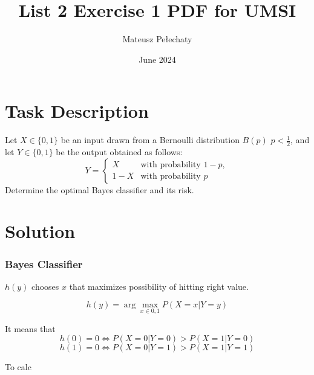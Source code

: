 \documentclass[11pt]{article}
\title{List 2 Exercise 1 PDF for UMSI}
\author{Mateusz Pełechaty}
\date{June 2024}
\begin{document}
\maketitle 

\section{Task Description}
Let $X \in \{0, 1\}$ 
be an input drawn from a Bernoulli distribution $B(p)$ $p < \frac{1}{2}$, 
and let $Y \in \{0, 1\}$ be the output obtained as follows:
$$
Y =
\begin{cases} 
X & \textrm{with probability } 1 - p, \\ 
1 - X & \textrm{with probability } p 
\end{cases}
$$
Determine the optimal Bayes classifier and its risk.

\section{Solution}

\subsubsection{Bayes Classifier}
$h(y)$ chooses $x$ that maximizes possibility of hitting right value.

$$h(y) = \arg \max_{x \in {0, 1}} P(X=x | Y=y)$$

It means that 
$$h(0) = 0 \iff P(X=0 | Y=0) > P(X=1 | Y=0)$$
$$h(1) = 0 \iff P(X=0 | Y=1) > P(X=1 | Y=1)$$

To calc
\end{document}
